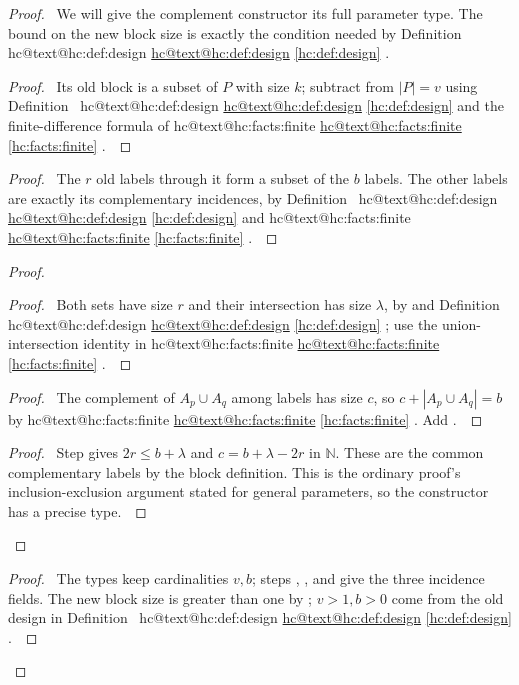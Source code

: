 \documentclass[11pt]{amsart}
\makeatletter
\let\qed\relax
\newcommand\nn{{\mathbb N}}%
\let\hcSavedRef\ref
\renewcommand{\ref}[1]{%
  \ifcsname hc@text@#1\endcsname
    \hyperlink{\csname hc@target@#1\endcsname}{\csname hc@text@#1\endcsname}%
  \else
    \hcSavedRef{#1}%
  \fi}}
\makeatother
\begin{document}
\begin{proof}
 \pfsketch\ We will give the complement constructor its full
 parameter type. The bound on the new block size is exactly the
 condition needed by Definition~\ref{hc:def:design}.
 \begin{proof}\pf\ Its old block is a subset of $P$ with size $k$;
  subtract from $|P|=v$ using Definition~\ref{hc:def:design}
  and the finite-difference formula of \ref{hc:facts:finite}.~\qed\end{proof}
 \begin{proof}\pf\ The $r$ old labels through it form a subset of
  the $b$ labels. The other labels are exactly its complementary
  incidences, by Definition~\ref{hc:def:design} and \ref{hc:facts:finite}.~\qed\end{proof}
 \begin{proof}
  \begin{proof}\pf\ Both sets have size $r$ and their intersection
   has size $\lambda$, by  and Definition~\ref{hc:def:design}; use
   the union-intersection identity in \ref{hc:facts:finite}.~\qed\end{proof}
  \begin{proof}\pf\ The complement of $A_p\cup A_q$ among labels
   has size $c$, so $c+|A_p\cup A_q|=b$ by
   \ref{hc:facts:finite}. Add .~\qed\end{proof}
  \qedstep
  \begin{proof}\pf\ Step  gives
   $2r\le b+\lambda$ and $c=b+\lambda-2r$ in $\nn$.
   These are the common complementary labels by the block definition.
   This is the ordinary proof's inclusion-exclusion argument stated
   for general parameters, so the constructor has a precise type.~\qed\end{proof}
 \end{proof}
 \qedstep
 \begin{proof}\pf\ The types keep cardinalities $v,b$;
  steps , ,
  and  give the three incidence fields.
  The new block size is greater than one by ; $v>1,b>0$
  come from the old design in Definition~\ref{hc:def:design}.~\qed\end{proof}
\end{proof}
\end{document}
